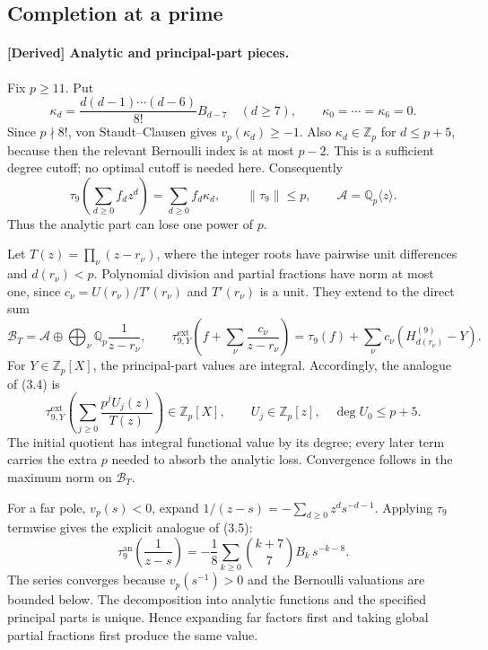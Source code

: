 \subsection{Completion at a prime}

\paragraph{\textnormal{[Derived] Analytic and principal-part pieces.}}
Fix $p\geq11$.  Put
\[
 \kappa_d=\frac{d(d-1)\cdots(d-6)}{8!}B_{d-7}\quad(d\geq7),
 \qquad \kappa_0=\cdots=\kappa_6=0.
\]
Since $p\nmid8!$, von Staudt--Clausen gives $v_p(\kappa_d)\geq-1$.
Also $\kappa_d\in\mathbb Z_p$ for $d\leq p+5$, because then the relevant
Bernoulli index is at most $p-2$.  This is a sufficient degree cutoff;
no optimal cutoff is needed here.  Consequently
\[
 \tau_9\!\left(\sum_{d\geq0}f_dz^d\right)=\sum_{d\geq0}f_d\kappa_d,
 \qquad \|\tau_9\|\leq p,
 \qquad \mathcal A=\mathbb Q_p\langle z\rangle .
\]
Thus the analytic part can lose one power of $p$.

Let $T(z)=\prod_\nu(z-r_\nu)$, where the integer roots have pairwise
unit differences and $d(r_\nu)<p$.  Polynomial division and partial
fractions have norm at most one, since
$c_\nu=U(r_\nu)/T'(r_\nu)$ and $T'(r_\nu)$ is a unit.  They extend to
the direct sum
\[
 \mathcal B_T=\mathcal A\oplus\bigoplus_\nu
       \mathbb Q_p\frac1{z-r_\nu},\qquad
 \tau^{\mathrm{ext}}_{9,Y}\!\left(f+\sum_\nu\frac{c_\nu}{z-r_\nu}\right)
 =\tau_9(f)+\sum_\nu c_\nu(H_{d(r_\nu)}^{(9)}-Y).
\]
For $Y\in\mathbb Z_p[X]$, the principal-part values are integral.
Accordingly, the analogue of (3.4) is
\begin{equation}
 \tau^{\mathrm{ext}}_{9,Y}
 \!\left(\sum_{j\geq0}\frac{p^jU_j(z)}{T(z)}\right)
 \in\mathbb Z_p[X],\qquad
 U_j\in\mathbb Z_p[z],\quad\deg U_0\leq p+5.
 \label{s3-completion}
\end{equation}
The initial quotient has integral functional value by its degree; every
later term carries the extra $p$ needed to absorb the analytic loss.
Convergence follows in the maximum norm on $\mathcal B_T$.

For a far pole, $v_p(s)<0$, expand $1/(z-s)=-\sum_{d\geq0}z^ds^{-d-1}$.
Applying $\tau_9$ termwise gives the explicit analogue of (3.5):
\begin{equation}
 \tau_9^{\mathrm{an}}\!\left(\frac1{z-s}\right)
 =-\frac18\sum_{k\geq0}\binom{k+7}{7}B_k\,s^{-k-8}.
 \label{s3-far-pole}
\end{equation}
The series converges because $v_p(s^{-1})>0$ and the Bernoulli valuations
are bounded below.  The decomposition into analytic functions and the
specified principal parts is unique.  Hence expanding far factors first
and taking global partial fractions first produce the same value.

